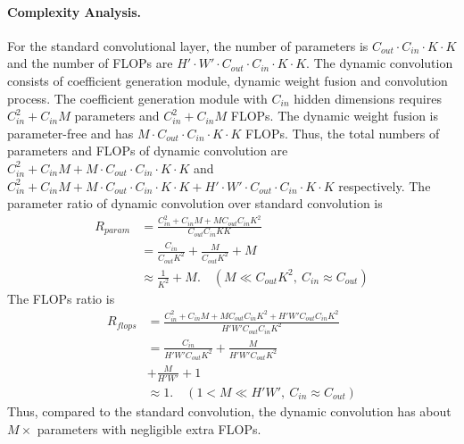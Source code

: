 \documentclass[10pt,twocolumn,letterpaper]{article}
\begin{document}
\paragraph{Complexity Analysis.}
For the standard convolutional layer, the number of parameters is $C_{out}\cdot C_{in}\cdot K\cdot K$ and the number of FLOPs are $H'\cdot W'\cdot C_{out}\cdot C_{in}\cdot K\cdot K$. The dynamic convolution consists of coefficient generation module, dynamic weight fusion and convolution process.
The coefficient generation module with $C_{in}$ hidden dimensions requires $C_{in}^2+C_{in}M$ parameters and $C_{in}^2+C_{in}M$ FLOPs. 
The dynamic weight fusion is parameter-free and has $M\cdot C_{out}\cdot C_{in}\cdot K\cdot K$ FLOPs. 
Thus, the total numbers of parameters and FLOPs of dynamic convolution are $C_{in}^2+C_{in}M + M\cdot C_{out}\cdot C_{in}\cdot K\cdot K$ and $C_{in}^2+C_{in}M + M\cdot C_{out}\cdot C_{in}\cdot K\cdot K+H'\cdot W'\cdot C_{out}\cdot C_{in}\cdot K\cdot K$ respectively. The parameter ratio of dynamic convolution over standard convolution is
\begin{equation}
	\begin{aligned}		
		R_{param} &= \frac{C_{in}^2+C_{in}M + M C_{out} C_{in} K^2}{C_{out} C_{in} K K} \\
		&= \frac{C_{in}}{C_{out} K^2} + \frac{M}{C_{out} K^2} + M\\
		&\approx \frac{1}{K^2} + M. \quad (M\ll C_{out} K^2,~C_{in}\approx C_{out})
	\end{aligned}
\end{equation}
The FLOPs ratio is
\begin{equation}
	\begin{aligned}
		R_{flops} &= \frac{C_{in}^2+C_{in}M + M C_{out} C_{in} K^2+H' W' C_{out} C_{in} K^2}{H' W' C_{out} C_{in} K^2} \\
		&= \frac{C_{in}}{H' W' C_{out} K^2} + \frac{M}{H' W' C_{out} K^2} \\
		& + \frac{M}{H' W'} + 1\\
		&\approx 1.  \quad (1<M\ll H'W',~C_{in}\approx C_{out})
	\end{aligned}
\end{equation}
Thus, compared to the standard convolution, the dynamic convolution has about $M\times$ parameters with negligible extra FLOPs. 
\end{document}
